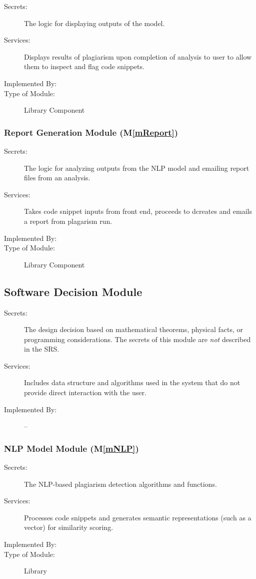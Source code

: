 \documentclass[12pt, titlepage]{article}
\newcommand{\mref}[1]{M\ref{#1}}
\begin{document}
\begin{description}
\item[Secrets:] The logic for displaying outputs of the model.
\item[Services:] Displays results of plagiarism upon completion of analysis
to user to allow them to inspect and flag code snippets.
\item[Implemented By:] \progname{}
\item[Type of Module:] Library Component
\end{description}

\subsubsection{Report Generation Module (\mref{mReport})}

\begin{description}
\item[Secrets:] The logic for analyzing outputs from the NLP model and emailing 
report files from an analysis.
\item[Services:] Takes code snippet inputs from front end, proceeds to dcreates and emails a report from plagarism run.
\item[Implemented By:] \progname{}
\item[Type of Module:] Library Component
\end{description}

\subsection{Software Decision Module}

\begin{description}
\item[Secrets:] The design decision based on mathematical theorems, physical
  facts, or programming considerations. The secrets of this module are
  \emph{not} described in the SRS.
\item[Services:] Includes data structure and algorithms used in the system that
  do not provide direct interaction with the user. 
\item[Implemented By:] --
\end{description}

\subsubsection{NLP Model Module (\mref{mNLP})}

\begin{description}
\item[Secrets:] The NLP-based plagiarism detection algorithms and functions.
\item[Services:] Processes code snippets and generates semantic representations (such as a vector) 
for similarity scoring.
\item[Implemented By:] \progname{}
\item[Type of Module:] Library
\end{description}
\end{document}
